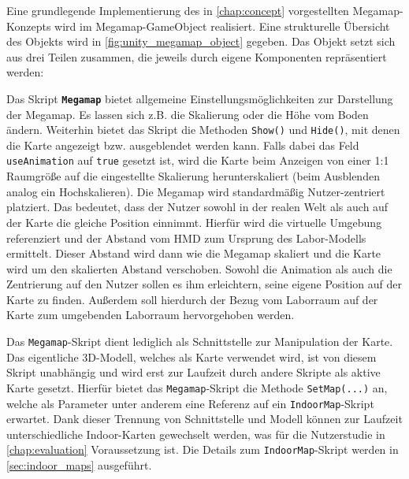 Eine grundlegende Implementierung des in \autoref{chap:concept} vorgestellten Megamap-Konzepts wird im Megamap-GameObject realisiert.
Eine strukturelle Übersicht des Objekts wird in \autoref{fig:unity_megamap_object} gegeben.
Das Objekt setzt sich aus drei Teilen zusammen, die jeweils durch eigene Komponenten repräsentiert werden:

Das Skript \textbf{\lstinline{Megamap}} bietet allgemeine Einstellungsmöglichkeiten zur Darstellung der Megamap.
Es lassen sich z.B. die Skalierung oder die Höhe vom Boden ändern.
Weiterhin bietet das Skript die Methoden \lstinline{Show()} und \lstinline{Hide()}, mit denen die Karte angezeigt bzw. ausgeblendet werden kann.
Falls dabei das Feld \lstinline{useAnimation} auf \lstinline{true} gesetzt ist, wird die Karte beim Anzeigen von einer 1:1 Raumgröße auf die eingestellte Skalierung herunterskaliert (beim Ausblenden analog ein Hochskalieren).
Die Megamap wird standardmäßig Nutzer-zentriert platziert.
Das bedeutet, dass der Nutzer sowohl in der realen Welt als auch auf der Karte die gleiche Position einnimmt.
Hierfür wird die virtuelle Umgebung referenziert und der Abstand vom HMD zum Ursprung des Labor-Modells ermittelt.
Dieser Abstand wird dann wie die Megamap skaliert und die Karte wird um den skalierten Abstand verschoben.
Sowohl die Animation als auch die Zentrierung auf den Nutzer sollen es ihm erleichtern, seine eigene Position auf der Karte zu finden.
Außerdem soll hierdurch der Bezug vom Laborraum auf der Karte zum umgebenden Laborraum hervorgehoben werden.

Das \lstinline|Megamap|-Skript dient lediglich als Schnittstelle zur Manipulation der Karte.
Das eigentliche 3D-Modell, welches als Karte verwendet wird, ist von diesem Skript unabhängig und wird erst zur Laufzeit durch andere Skripte als aktive Karte gesetzt.
Hierfür bietet das \lstinline|Megamap|-Skript die Methode \lstinline|SetMap(...)| an, welche als Parameter unter anderem eine Referenz auf ein \lstinline|IndoorMap|-Skript erwartet.
Dank dieser Trennung von Schnittstelle und Modell können zur Laufzeit unterschiedliche Indoor-Karten gewechselt werden, was für die Nutzerstudie in \autoref{chap:evaluation} Voraussetzung ist.
Die Details zum \lstinline|IndoorMap|-Skript werden in \autoref{sec:indoor_maps} ausgeführt.

